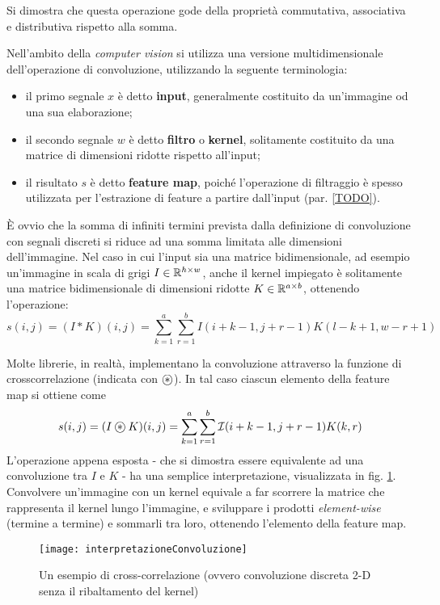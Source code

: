 Si dimostra che questa operazione gode della proprietà commutativa, associativa e distributiva rispetto alla somma.

Nell'ambito della \textit{computer vision} si utilizza una versione multidimensionale dell'operazione di convoluzione, utilizzando la seguente terminologia:
\begin{itemize}
\item il primo segnale $x$ è detto \textbf{input}, generalmente costituito da un'immagine od una sua elaborazione;
\item il secondo segnale $w$ è detto \textbf{filtro} o \textbf{kernel}, solitamente costituito da una matrice
di dimensioni ridotte rispetto all'input;
\item il risultato $s$ è detto \textbf{feature map}, poiché l'operazione di filtraggio è spesso utilizzata per l'estrazione di feature a partire dall'input (par. \ref{TODO}).
\end{itemize}
È ovvio che la somma di infiniti termini prevista dalla definizione di convoluzione con segnali discreti si riduce ad una somma limitata alle dimensioni dell'immagine. Nel caso in cui l'input sia una matrice bidimensionale, ad esempio un'immagine in scala di grigi $I\in\mathbb{R}^{h\times w}$, anche il kernel impiegato è solitamente una matrice bidimensionale di dimensioni ridotte $K\in\mathbb{R}^{a\times b}$, ottenendo l’operazione:
\begin{equation*}
s(i,j)=(I\ast K)(i,j)=\sum_{k=1}^a\sum_{r=1}^b I(i+k-1,j+r-1)K(l-k+1,w-r+1)
\end{equation*}

Molte librerie, in realtà, implementano la convoluzione attraverso la funzione di crosscorrelazione (indicata con $\oast$).
In tal caso ciascun elemento della feature map si ottiene come
\begin{equation*}
s(i,j)=(I\oast K)(i,j)=\sum_{k=1}^a\sum_{r=1}^b\mathcal{I}(i+k-1,j+r-1)K(k,r)
\end{equation*}
L'operazione appena esposta - che si dimostra essere equivalente ad una convoluzione tra $I$ e $K$ - ha una semplice interpretazione, visualizzata in fig. \ref{fig:interpretazioneConvoluzione}. Convolvere un'immagine con un kernel equivale a far scorrere la matrice che rappresenta il kernel lungo l'immagine, e sviluppare i prodotti \textit{element-wise} (termine a termine) e sommarli tra loro, ottenendo l'elemento della feature map.

\begin{figure}[h]
\centering
\texttt{[image: interpretazioneConvoluzione]}
\caption{Un esempio di cross-correlazione (ovvero convoluzione discreta 2-D senza il
ribaltamento del kernel)}
\label{fig:interpretazioneConvoluzione}
\end{figure}


